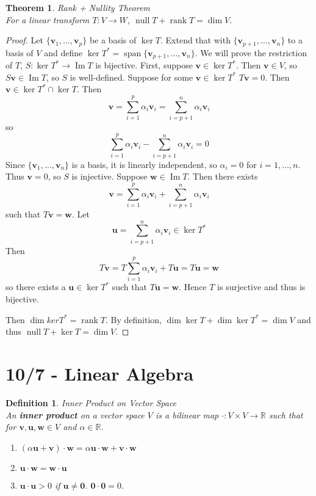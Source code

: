 \documentclass[12pt]{article}
\newtheorem{thm}{Theorem}[section] %
\theoremstyle{plain}
\newtheorem{definition}{Definition}[section]
\newcommand{\R}{\mathbb{R}}
\DeclareMathOperator{\spn}{span}
\DeclareMathOperator{\nul}{null}
\DeclareMathOperator{\rank}{rank}
\DeclareMathOperator{\im}{Im}
\newcommand{\vv}{\mathbf{v}}
\newcommand{\vu}{\mathbf{u}}
\newcommand{\vw}{\mathbf{w}}
\newcommand{\vzero}{\mathbf{0}}
\begin{document}
    \begin{thm}{Rank + Nullity Theorem}
        ~\\For a linear transform $T:V \to W$, $\nul T + \rank T = \dim V$.
    \end{thm}

    \begin{proof}
        Let $\{\vv_1, \dots, \vv_p\}$ be a basis of $\ker T$. Extend that with $\{\vv_{p+1}, \dots, \vv_{n}\}$ to a basis of $V$ and define $\ker T^* = \spn \{\vv_{p+1}, \dots, \vv_{n}\}$. We will prove the restriction of $T$, $S:\ker T^* \to \im T$ is bijective. First, suppose $\vv \in \ker T^*$. Then $\vv \in V$, so $S\vv \in \im T$, so $S$ is well-defined. Suppose for some $\vv \in \ker T^*$ $T\vv = 0$. Then $\vv \in \ker T^* \cap \ker T$. Then $$\vv = \sum_{i = 1}^p \alpha_i \vv_i = \sum_{i = p+1}^n \alpha_i \vv_i$$so$$\sum_{i = 1}^p \alpha_i \vv_i - \sum_{i = p+1}^n \alpha_i \vv_i = 0$$Since $\{\vv_1, \dots, \vv_n\}$ is a basis, it is linearly independent, so $\alpha_i = 0$ for $i = 1, \dots, n$. Thus $\vv = 0$, so $S$ is injective. Suppose $\vw \in \im T$. Then there exists $$\vv = \sum_{i = 1}^p \alpha_i \vv_i + \sum_{i = p+1}^n \alpha_i \vv_i$$such that $T\vv = \vw$. Let$$\vu = \sum_{i = p+1}^n \alpha_i \vv_i \in \ker T^*$$Then $$T\vv = T\sum_{i = 1}^p \alpha_i \vv_i + T\vu = T\vu = \vw$$so there exists a $\vu \in \ker T^*$ such that $T \vu = \vw$. Hence $T$ is surjective and thus is bijective.

        Then $\dim ker T^* = \rank T$. By definition, $\dim \ker T + \dim \ker T^* = \dim V$ and thus $\nul T + \ker T = \dim V$.
    \end{proof}

    \section[d3]{10/7 - Linear Algebra}

    \begin{definition}{Inner Product on Vector Space}
        ~\\An \textbf{inner product} on a vector space $V$ is a bilinear map $\cdot:V \times V \to \R$ such that for $\vv, \vu, \vw \in V$ and $\alpha \in \R$.
        \begin{enumerate}
            \item $(\alpha \vu + \vv) \cdot \vw = \alpha \vu \cdot \vw + \vv \cdot \vw$
            \item $\vu \cdot \vw = \vw \cdot \vu$
            \item $\vu \cdot \vu > 0$ if $\vu \neq \vzero$. $\vzero \cdot \vzero = 0$. 
        \end{enumerate}
    \end{definition}
\end{document}
